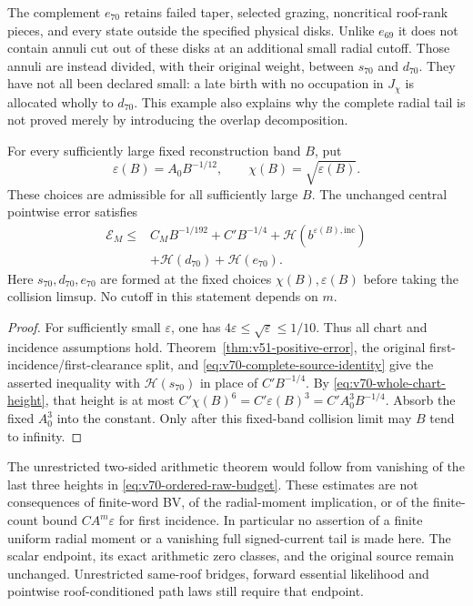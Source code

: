 The complement $e_{70}$ retains failed taper, selected grazing,
noncritical roof-rank pieces, and every state outside the specified
physical disks. Unlike $e_{69}$ it does not contain annuli cut out
of these disks at an additional small radial cutoff. Those annuli
are instead divided, with their original weight, between $s_{70}$
and $d_{70}$. They have not all been declared small: a late birth
with no occupation in $J_\chi$ is allocated wholly to $d_{70}$.
This example also explains why the complete radial tail is not proved
merely by introducing the overlap decomposition.

\begin{corollary}
\label{cor:v70-ordered-raw-budget}
For every sufficiently large fixed reconstruction band $B$, put
\[
 \varepsilon(B)=A_0B^{-1/12},\qquad
                  \chi(B)=\sqrt{\varepsilon(B)}.
\]
These choices are admissible for all sufficiently large $B$.
The unchanged central pointwise error satisfies
\begin{equation}\label{eq:v70-ordered-raw-budget}
 \begin{split}
 \mathcal E_M\le{}&C_MB^{-1/192}+C'B^{-1/4}
           +\mathcal H(b^{\varepsilon(B),\mathrm{inc}})\\
           &+\mathcal H(d_{70})+\mathcal H(e_{70}).
 \end{split}
\end{equation}
Here $s_{70},d_{70},e_{70}$ are formed at the fixed choices
$\chi(B),\varepsilon(B)$ before taking the collision limsup.
No cutoff in this statement depends on $m$.
\end{corollary}
\begin{proof}
For sufficiently small $\varepsilon$, one has
$4\varepsilon\le\sqrt\varepsilon\le1/10$. Thus all chart and
incidence assumptions hold. Theorem~\ref{thm:v51-positive-error},
the original first-incidence/first-clearance split, and
\eqref{eq:v70-complete-source-identity} give the asserted inequality
with $\mathcal H(s_{70})$ in place of $C'B^{-1/4}$.
By \eqref{eq:v70-whole-chart-height}, that height is at most
$C'\chi(B)^6=C'\varepsilon(B)^3=C'A_0^3B^{-1/4}$.
Absorb the fixed $A_0^3$ into the constant. Only after this fixed-band
collision limit may $B$ tend to infinity.
\end{proof}

The unrestricted two-sided arithmetic theorem would follow from
vanishing of the last three heights in
\eqref{eq:v70-ordered-raw-budget}. These estimates are not consequences
of finite-word BV, of the radial-moment implication, or of the
finite-count bound $CA^m\varepsilon$ for first incidence. In
particular no assertion of a finite uniform radial moment or a
vanishing full signed-current tail is made here. The scalar endpoint,
its exact arithmetic zero classes, and the original source remain
unchanged. Unrestricted same-roof bridges, forward essential likelihood
and pointwise roof-conditioned path laws still require that endpoint.

